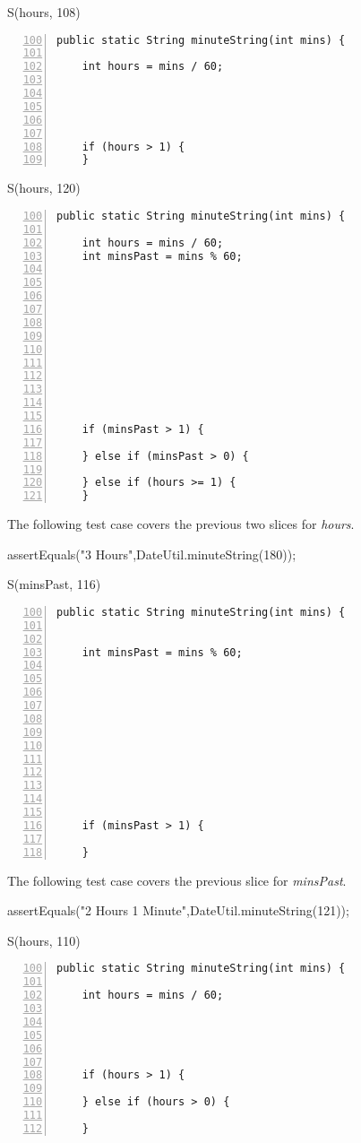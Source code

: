 \documentclass[fontsize=12pt,paper=letter,twoside]{scrartcl}
\begin{document}
\break
S(hours, 108)
\begin{lstlisting}[numbers=left,firstnumber=100]
  public static String minuteString(int mins) {
    
    int hours = mins / 60;
    
    


    
    if (hours > 1) {
    }
\end{lstlisting}


S(hours, 120)
\begin{lstlisting}[numbers=left,firstnumber=100]
  public static String minuteString(int mins) {
    
    int hours = mins / 60;
    int minsPast = mins % 60;
    
    
    
    
    
     
    
     
    
     
    

    if (minsPast > 1) {
      
    } else if (minsPast > 0) {
      
    } else if (hours >= 1) {
    }
\end{lstlisting}
The following test case covers the previous two slices for \emph{hours}.
\begin{code}
assertEquals("3 Hours",DateUtil.minuteString(180));
\end{code}
S(minsPast, 116)
\begin{lstlisting}[numbers=left,firstnumber=100]
  public static String minuteString(int mins) {
    
    
    int minsPast = mins % 60;
    
    
    
    
    
     
    
     
    
     
    

    if (minsPast > 1) {
      
    }
\end{lstlisting}
The following test case covers the previous slice for \emph{minsPast}.
\begin{code}
assertEquals("2 Hours 1 Minute",DateUtil.minuteString(121));
\end{code}
S(hours, 110)
\begin{lstlisting}[numbers=left,firstnumber=100]
  public static String minuteString(int mins) {
    
    int hours = mins / 60;
    
    
    
    
    
    if (hours > 1) {
      
    } else if (hours > 0) {
    
    }
\end{lstlisting}
\end{document}
